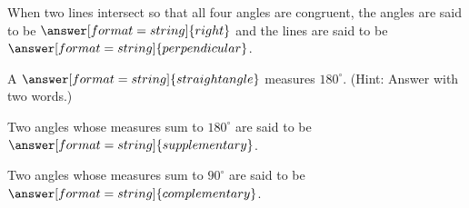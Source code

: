 \documentclass[nooutcomes]{ximera}
\begin{document}
\begin{question}  
When two lines intersect so that all four angles are congruent, the angles are said to be $\answer[format=string]{right}$ and the lines are said to be $\answer[format=string]{perpendicular}$.
\end{question}

\begin{question}  
A $\answer[format=string]{straight angle}$ measures $180^\circ$.  (Hint: Answer with two words.)
\end{question}

\begin{question}  
Two angles whose measures sum to $180^\circ$ are said to be $\answer[format=string]{supplementary}$.  
\end{question}

\begin{question}  
Two angles whose measures sum to $90^\circ$ are said to be $\answer[format=string]{complementary}$.  
\end{question}
\end{document}
